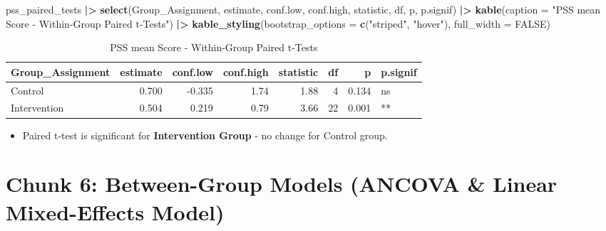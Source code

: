 \documentclass[
]{article}
\newenvironment{Shaded}{\begin{snugshade}}{\end{snugshade}}
\newcommand{\AttributeTok}[1]{\textcolor[rgb]{0.13,0.29,0.53}{#1}}
\newcommand{\ConstantTok}[1]{\textcolor[rgb]{0.56,0.35,0.01}{#1}}
\newcommand{\FunctionTok}[1]{\textcolor[rgb]{0.13,0.29,0.53}{\textbf{#1}}}
\newcommand{\NormalTok}[1]{#1}
\newcommand{\SpecialCharTok}[1]{\textcolor[rgb]{0.81,0.36,0.00}{\textbf{#1}}}
\newcommand{\StringTok}[1]{\textcolor[rgb]{0.31,0.60,0.02}{#1}}
\providecommand{\tightlist}{%
  \setlength{\itemsep}{0pt}\setlength{\parskip}{0pt}}
\begin{document}
\begin{Shaded}
\begin{Highlighting}[]
\NormalTok{pss\_paired\_tests }\SpecialCharTok{|\textgreater{}} 
  \FunctionTok{select}\NormalTok{(Group\_Assignment, estimate, conf.low, conf.high, statistic, df, p, p.signif) }\SpecialCharTok{|\textgreater{}} 
  \FunctionTok{kable}\NormalTok{(}\AttributeTok{caption =} \StringTok{"PSS mean Score {-} Within{-}Group Paired t{-}Tests"}\NormalTok{) }\SpecialCharTok{|\textgreater{}} 
  \FunctionTok{kable\_styling}\NormalTok{(}\AttributeTok{bootstrap\_options =} \FunctionTok{c}\NormalTok{(}\StringTok{"striped"}\NormalTok{, }\StringTok{"hover"}\NormalTok{), }\AttributeTok{full\_width =} \ConstantTok{FALSE}\NormalTok{)}
\end{Highlighting}
\end{Shaded}

\begin{longtable}[t]{lrrrrrrl}
\caption{\label{tab:unnamed-chunk-8}PSS mean Score - Within-Group Paired t-Tests}\\
\toprule
Group\_Assignment & estimate & conf.low & conf.high & statistic & df & p & p.signif\\
\midrule
Control & 0.700 & -0.335 & 1.74 & 1.88 & 4 & 0.134 & ns\\
Intervention & 0.504 & 0.219 & 0.79 & 3.66 & 22 & 0.001 & **\\
\bottomrule
\end{longtable}

\begin{itemize}
\tightlist
\item
  Paired t-test is significant for \textbf{Intervention Group} - no
  change for Control group.
\end{itemize}

\section{Chunk 6: Between-Group Models (ANCOVA \& Linear Mixed-Effects
Model)}\label{chunk-6-between-group-models-ancova-linear-mixed-effects-model}
\end{document}
